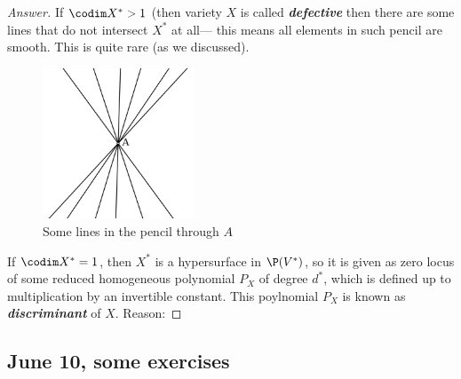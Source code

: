 \begin{proof}[Answer]
	If $\codim X^*>1$ (then variety $X$ is called \textit{\textbf{defective}} then there are some lines that do not intersect $X^*$ at all--- this means all elements in such pencil are smooth. This is quite rare (as we discussed).
	\begin{figure}[H]
		\centering
		\includegraphics[width=0.4\textwidth]{pencil.png}
		\caption*{Some lines in the pencil through $A$}
	\end{figure}
	If $\codim X^*=1$, then $X^*$ is a hypersurface in $\P(V^*)$, so it is given as zero locus of some reduced homogeneous polynomial $P_X$ of degree $d^*$, which is defined up to multiplication by an invertible constant. This poylnomial $P_X$ is known as \textit{\textbf{discriminant}} of $X$. Reason:

\end{proof}

\subsection{June 10, some exercises}\label{ssec:June 10, some exercises}


